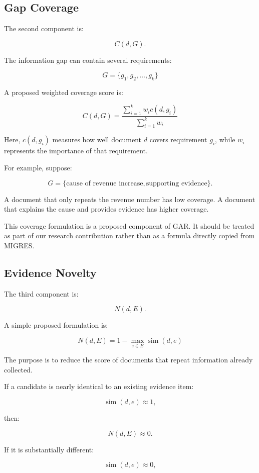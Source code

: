 \documentclass[11pt,a4paper]{article}
\begin{document}
\subsection{Gap Coverage}

The second component is:

\[
C(d,G).
\]

The information gap can contain several requirements:

\[
\boxed{
G=\{g_1,g_2,\ldots,g_k\}
}
\tag{5}
\]

A proposed weighted coverage score is:

\[
\boxed{
C(d,G)
=
\frac{
\sum_{i=1}^{k}w_i c(d,g_i)
}{
\sum_{i=1}^{k}w_i
}
}
\tag{6}
\]

Here, $c(d,g_i)$ measures how well document $d$ covers requirement $g_i$, while $w_i$ represents the importance of that requirement.

For example, suppose:

\[
G=
\{
\text{cause of revenue increase},
\text{supporting evidence}
\}.
\]

A document that only repeats the revenue number has low coverage. A document that explains the cause and provides evidence has higher coverage.

This coverage formulation is a proposed component of GAR. It should be treated as part of our research contribution rather than as a formula directly copied from MIGRES.

\subsection{Evidence Novelty}

The third component is:

\[
N(d,E).
\]

A simple proposed formulation is:

\[
\boxed{
N(d,E)
=
1-
\max_{e\in E}\operatorname{sim}(d,e)
}
\tag{7}
\]

The purpose is to reduce the score of documents that repeat information already collected.

If a candidate is nearly identical to an existing evidence item:

\[
\operatorname{sim}(d,e)\approx1,
\]

then:

\[
N(d,E)\approx0.
\]

If it is substantially different:

\[
\operatorname{sim}(d,e)\approx0,
\]
\end{document}
